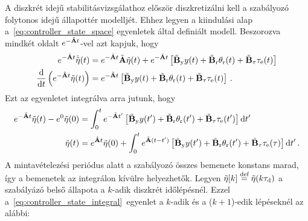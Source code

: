 A diszkrét idejű stabilitásvizsgálathoz először diszkretizálni kell a szabályozó folytonos idejű állapottér modelljét.
Ehhez legyen a kiindulási alap a~\eqref{eq:controller_state_space} egyenletek által definiált modell.
Beszorozva mindkét oldalt \(e^{-\tilde {\mathbf{A}} t}\)-vel azt kapjuk, hogy
\begin{align}
    \begin{split}
        e^{-\tilde {\mathbf{A}} t}\dot{\tilde{\mathbf{\eta}}}(t) &= e^{-\tilde {\mathbf{A}} t}\tilde {\mathbf{A}} \tilde{\mathbf{\eta}}(t) +
        e^{-\tilde {\mathbf{A}} t}\left[\tilde{\mathbf{B}}_{\mathrm{y}} y(t) + 
        \tilde{\mathbf{B}}_{\mathrm{r}} \theta_{\mathrm{r}}(t) +
        \tilde{\mathbf{B}}_{\mathrm{\tau}} \tau_{\mathrm{e}}(t)\right] \\
        \frac{\mathrm{d}}{\mathrm{d} t}\left(e^{-\tilde {\mathbf{A}} t}\tilde{\mathbf{\eta}}(t)\right) &= e^{-\tilde {\mathbf{A}} t}\left[\tilde{\mathbf{B}}_{\mathrm{y}} y(t) + 
        \tilde{\mathbf{B}}_{\mathrm{r}} \theta_{\mathrm{r}}(t) +
        \tilde{\mathbf{B}}_{\mathrm{\tau}} \tau_{\mathrm{e}}(t)\right]\,.
    \end{split}        
\end{align}
Ezt az egyenletet integrálva arra jutunk, hogy
\begin{align}\label{eq:controller_state_integral}
    \begin{split}
        e^{-\tilde {\mathbf{A}} t}\tilde{\mathbf{\eta}}(t) - e^0 \tilde{\mathbf{\eta}}(0) &= \int_{0}^{t} e^{-\tilde {\mathbf{A}} t'}\left[\tilde{\mathbf{B}}_{\mathrm{y}} y(t') + 
        \tilde{\mathbf{B}}_{\mathrm{r}} \theta_{\mathrm{r}}(t') +
        \tilde{\mathbf{B}}_{\mathrm{\tau}} \tau_{\mathrm{e}}(t')\right] \mathrm{d}t' \\
        \tilde{\mathbf{\eta}}(t) &= e^{\tilde {\mathbf{A}} t}\tilde{\mathbf{\eta}}(0) + \int_{0}^{t} e^{\tilde {\mathbf{A}} (t-t')}\left[\tilde{\mathbf{B}}_{\mathrm{y}} y(t') + 
        \tilde{\mathbf{B}}_{\mathrm{r}} \theta_{\mathrm{r}}(t') +
        \tilde{\mathbf{B}}_{\mathrm{\tau}} \tau_{\mathrm{e}}(\tau)\right] \mathrm{d}t'\,.
    \end{split}        
\end{align}
A mintavételezési periódus alatt a szabályozó összes bemenete konstans marad, így a bemenetek az 
integrálon kívülre helyezhetők. Legyen \(\tilde{\mathbf{\eta}}[k] \stackrel{\text{def}}{=} \tilde{\mathbf{\eta}}(k\tau_{\mathrm{d}})\) 
a szabályázó belső állapota a \(k\)-adik diszkrét időlépésnél. Ezzel a~\eqref{eq:controller_state_integral}~egyenlet a \(k\)-adik és a (\(k+1\))-edik lépéseknél az alábbi:
